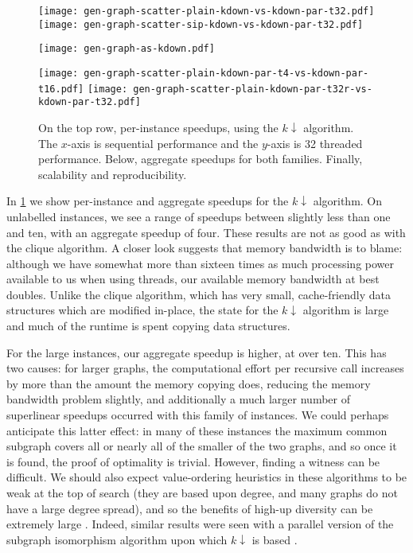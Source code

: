 \documentclass[sigconf]{acmart}
\begin{document}
\begin{figure}[tb]
    \texttt{[image: gen-graph-scatter-plain-kdown-vs-kdown-par-t32.pdf]}
    \hfill
    \texttt{[image: gen-graph-scatter-sip-kdown-vs-kdown-par-t32.pdf]}

    \vspace*{1em}

    \texttt{[image: gen-graph-as-kdown.pdf]}

    \vspace*{0.2em}

    \texttt{[image: gen-graph-scatter-plain-kdown-par-t4-vs-kdown-par-t16.pdf]}
    \hfill
    \texttt{[image: gen-graph-scatter-plain-kdown-par-t32r-vs-kdown-par-t32.pdf]}

    \caption{On the top row, per-instance speedups, using the $k{\downarrow}$ algorithm. The
    $x$-axis is sequential performance and the $y$-axis is 32 threaded performance. Below,
    aggregate speedups for both families. Finally, scalability and reproducibility.}\label{figure:kdownscatters}
\end{figure}

In \cref{figure:kdownscatters} we show per-instance and aggregate speedups for the $k{\downarrow}$
algorithm. On unlabelled instances, we see a range of speedups between slightly less than one and
ten, with an aggregate speedup of four. These results are not as good as with the clique algorithm.
A closer look suggests that memory bandwidth is to blame: although we have somewhat more than
sixteen times as much processing power available to us when using threads, our available memory
bandwidth at best doubles. Unlike the clique algorithm, which has very
small, cache-friendly data structures which are modified in-place, the state for the $k{\downarrow}$
algorithm is large and much of the runtime is spent copying data structures.

For the large instances, our aggregate speedup is higher, at over ten. This has two causes: for
larger graphs, the computational effort per recursive call increases by more than the amount the
memory copying does, reducing the memory bandwidth problem slightly, and additionally a much larger
number of superlinear speedups occurred with this family of instances. We could perhaps anticipate
this latter effect: in many of these instances the maximum common subgraph covers all or nearly all
of the smaller of the two graphs, and so once it is found, the proof of optimality is trivial.
However, finding a witness can be difficult. We should also expect value-ordering heuristics in
these algorithms to be weak at the top of search (they are based upon degree, and many graphs do not
have a large degree spread), and so the benefits of high-up diversity can be extremely large
\citep{DBLP:conf/ijcai/HarveyG95,DBLP:conf/cp/ChuSS09,DBLP:journals/topc/McCreeshP15}. Indeed,
similar results were seen with a parallel version of the subgraph isomorphism algorithm upon which
$k{\downarrow}$ is based \citep{DBLP:conf/cp/McCreeshP15}.
\end{document}
